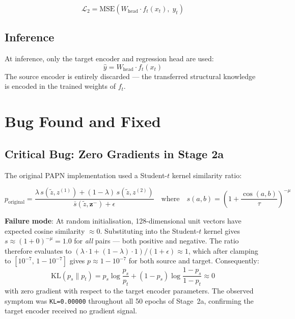 \documentclass[12pt,a4paper]{article}
\begin{document}
\begin{equation}
    \mathcal{L}_2 = \text{MSE}(W_{\text{head}} \cdot f_t(x_t),\; y_t)
\end{equation}

\subsection{Inference}

At inference, only the target encoder and regression head are used:
\begin{equation}
    \hat{y} = W_{\text{head}} \cdot f_t(x_t)
\end{equation}
The source encoder is entirely discarded — the transferred structural knowledge
is encoded in the trained weights of $f_t$.

\section{Bug Found and Fixed}

\subsection{Critical Bug: Zero Gradients in Stage 2a}

The original PAPN implementation used a Student-$t$ kernel similarity ratio:

\begin{equation}
    p_{\text{original}} =
    \frac{\lambda\, s(\tilde{z}, z^{(1)}) + (1-\lambda)\, s(\tilde{z}, z^{(2)})}
         {\bar{s}(\tilde{z}, \mathbf{z}^-) + \epsilon}
    \quad \text{where} \quad
    s(a, b) = \left(1 + \frac{\cos(a,b)}{\tau}\right)^{-\mu}
\end{equation}

\textbf{Failure mode}: At random initialisation, 128-dimensional unit vectors
have expected cosine similarity $\approx 0$.  Substituting into the Student-$t$
kernel gives $s \approx (1 + 0)^{-\mu} = 1.0$ for \emph{all} pairs — both
positive and negative.  The ratio therefore evaluates to
$(\lambda \cdot 1 + (1-\lambda) \cdot 1) / (1 + \epsilon) \approx 1$, which
after clamping to $[10^{-7},\, 1-10^{-7}]$ gives $p \approx 1 - 10^{-7}$
for both source and target.  Consequently:
\begin{equation}
    \text{KL}(p_s \| p_t) = p_s \log\frac{p_s}{p_t} + (1-p_s)\log\frac{1-p_s}{1-p_t}
    \approx 0
\end{equation}
with zero gradient with respect to the target encoder parameters.
The observed symptom was \texttt{KL=0.00000} throughout all 50 epochs of
Stage~2a, confirming the target encoder received no gradient signal.
\end{document}
